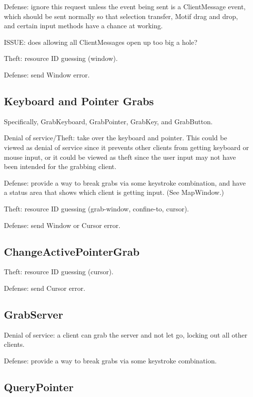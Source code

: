 \documentclass{article}
\begin{document}
Defense: ignore this request unless the event being sent is a
ClientMessage event, which should be sent normally so that selection
transfer, Motif drag and drop, and certain input methods have a chance
at working.

ISSUE: does allowing all ClientMessages open up too big a hole?

Theft: resource ID guessing (window).

Defense: send Window error.



\subsection{Keyboard and Pointer Grabs}

Specifically, GrabKeyboard, GrabPointer, GrabKey, and GrabButton.

Denial of service/Theft: take over the keyboard and pointer.  This
could be viewed as denial of service since it prevents other clients
from getting keyboard or mouse input, or it could be viewed as theft
since the user input may not have been intended for the grabbing
client.

Defense: provide a way to break grabs via some keystroke combination,
and have a status area that shows which client is getting input.
(See MapWindow.)

Theft: resource ID guessing (grab-window, confine-to, cursor).

Defense: send Window or Cursor error.



\subsection{ChangeActivePointerGrab}

Theft: resource ID guessing (cursor).

Defense: send Cursor error.



\subsection{GrabServer}

Denial of service: a client can grab the server and not let go,
locking out all other clients.

Defense: provide a way to break grabs via some keystroke combination.



\subsection{QueryPointer}
\end{document}
